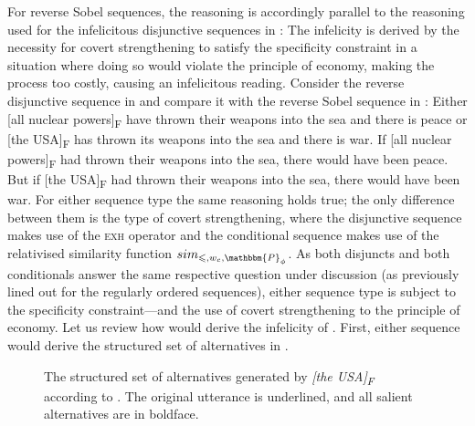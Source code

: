 For reverse Sobel sequences, the reasoning is accordingly parallel to the reasoning used for the infelicitous disjunctive sequences in : The infelicity is derived by the necessity for covert strengthening to satisfy the specificity constraint in a situation where doing so would violate the principle of economy, making the process too costly, causing an infelicitous reading. Consider the reverse disjunctive sequence in  and compare it with the reverse Sobel sequence in :
\ex
\ljudge{\#}Either [all nuclear powers]\textsubscript{F} have thrown their weapons into the sea and there is peace or [the USA]\textsubscript{F} has thrown its weapons into the sea and there is war.
\xe
\pex\label{ex:ippolito-reverseSS}
\a If [all nuclear powers]\textsubscript{F} had thrown their weapons into the sea, there would have been peace.
\a \ljudge{\#}But if [the USA]\textsubscript{F} had thrown their weapons into the sea, there would have been war.
\xe
For either sequence type the same reasoning holds true; the only difference between them is the type of covert strengthening, where the disjunctive sequence makes use of the {\scshape exh} operator and the conditional sequence makes use of the relativised similarity function $sim_{\leqslant,w_c,\mathbbm{P}_\phi}$. As both disjuncts and both conditionals answer the same respective question under discussion (as previously lined out for the regularly ordered sequences), either sequence type is subject to the specificity constraint---and the use of covert strengthening to the principle of economy. Let us review how \textcite{Ippolito2020} would derive the infelicity of . First, either sequence would derive the structured set of alternatives in .
\begin{figure}[!htb]
    \centering\hspace{-2cm}
    
    \caption{The structured set of alternatives generated by \textit{[the USA]\textsubscript{F}} according to \textcite{Ippolito2020}. The original utterance is underlined, and all salient alternatives are in boldface.}
\end{figure}
